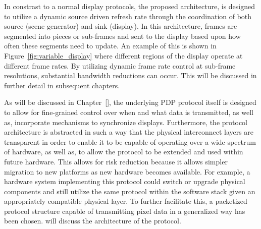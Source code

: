 In constrast to a normal display protocols, the proposed architecture, is designed to utilize a dynamic source driven refresh rate through the coordination of both source (scene generator) and sink (display). In this architecture, frames are segmented into pieces or sub-frames and sent to the display based upon how often these segments need to update. An example of this is shown in Figure~\ref{fig:variable_display} where different regions of the display operate at different frame rates. By utilizing dynamic frame rate control at sub-frame resolutions, substantial bandwidth reductions can occur. This will be discussed in further detail in subsequent chapters.

As will be discussed in Chapter~\ref{}, the underlying PDP protocol itself is designed to allow for fine-grained control over when and what data is transmitted, as well as, incorporate mechanisms to synchronize displays. Furthermore, the protocol architecture is abstracted in such a way that the physical interconnect layers are transparent in order to enable it to be capable of operating over a wide-spectrum of hardware, as well as, to allow the protocol to be extended and used within future hardware. This allows for risk reduction because it allows simpler migration to new platforms as new hardware becomes available. For example, a hardware system implementing this protocol could switch or upgrade physical components and still utilize the same protocol within the software stack given an appropriately compatible physical layer. To further facilitate this, a packetized protocol structure capable of transmitting pixel data in a generalized way has been chosen. will discuss the architecture of the protocol.
